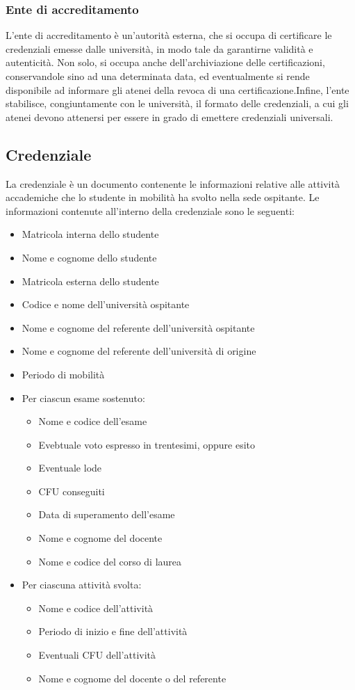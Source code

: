 \documentclass[a4paper,12pt]{article}
\begin{document}
\subsubsection{Ente di accreditamento}
L'ente di accreditamento è un'autorità esterna, che si occupa di certificare le credenziali emesse dalle università, in modo tale da garantirne validità e autenticità. Non solo, si occupa anche dell'archiviazione delle certificazioni, conservandole sino ad una determinata data, ed eventualmente si rende disponibile ad informare gli atenei della revoca di una certificazione.\newline Infine, l'ente stabilisce, congiuntamente con le università, il formato delle credenziali, a cui gli atenei devono attenersi per essere in grado di emettere credenziali universali.
\subsection{Credenziale}
La credenziale è un documento contenente le informazioni relative alle attività accademiche che lo studente in mobilità ha svolto nella sede ospitante. 
\newline Le informazioni contenute all'interno della credenziale sono le seguenti:
\begin{itemize}
    \item Matricola interna dello studente
    \item Nome e cognome dello studente
    \item Matricola esterna dello studente
    \item Codice e nome dell'università ospitante
    \item Nome e cognome del referente dell'università ospitante
    \item Nome e cognome del referente dell'università di origine
    \item Periodo di mobilità
    \item Per ciascun esame sostenuto:
    \begin{itemize}[label=$\circ$]
        \item Nome e codice dell'esame
        \item Evebtuale voto espresso in trentesimi, oppure esito
        \item Eventuale lode
        \item CFU conseguiti
        \item Data di superamento dell'esame
        \item Nome e cognome del docente
        \item Nome e codice del corso di laurea
    \end{itemize}
    \item Per ciascuna attività svolta:
    \begin{itemize}[label=$\circ$]
        \item Nome e codice dell'attività
        \item Periodo di inizio e fine dell'attività
        \item Eventuali CFU dell'attività
        \item Nome e cognome del docente o del referente
    \end{itemize}
\end{itemize}
\end{document}
